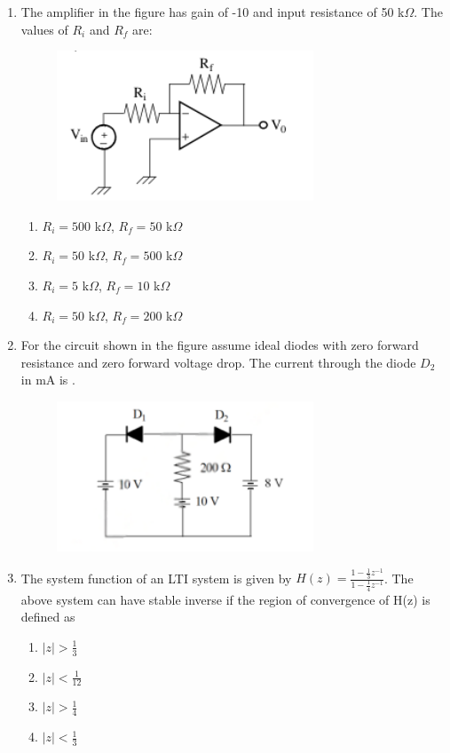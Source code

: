\documentclass[journal,12pt,onecolumn]{IEEEtran}
\theoremstyle{remark}
\begin{document}
\begin{enumerate}
    \item The amplifier in the figure has gain of -10 and input resistance of 50 k$\Omega$. The values of $R_i$ and $R_f$ are:
    \begin{figure}[H]
        \centering
        \includegraphics[width=0.4\columnwidth]{q14}
        \caption*{}
        \label{fig:placeholder}
    \end{figure}
    \begin{multicols}{2}
        \begin{enumerate}
            \item $R_i = 500$ k$\Omega$, $R_f = 50$ k$\Omega$
            \item $R_i = 50$ k$\Omega$, $R_f = 500$ k$\Omega$
            \item $R_i = 5$ k$\Omega$, $R_f = 10$ k$\Omega$
            \item $R_i = 50$ k$\Omega$, $R_f = 200$ k$\Omega$
        \end{enumerate}
    \end{multicols}
    
    \item For the circuit shown in the figure assume ideal diodes with zero forward resistance and zero forward voltage drop. The current through the diode $D_2$ in mA is \underline{\hspace{2cm}}.
    \begin{figure}[H]
        \centering
        \includegraphics[width=0.4\columnwidth]{q15}
        \caption*{}
        \label{fig:placeholder}
    \end{figure}
    
    \item The system function of an LTI system is given by $H(z) = \frac{1 - \frac{1}{3}z^{-1}}{1 - \frac{1}{4}z^{-1}}$. The above system can have stable inverse if the region of convergence of H(z) is defined as
    \begin{multicols}{4}
        \begin{enumerate}
            \item $|z| > \frac{1}{3}$
            \item $|z| < \frac{1}{12}$
            \item $|z| > \frac{1}{4}$
            \item $|z| < \frac{1}{3}$
        \end{enumerate}
    \end{multicols}
    

\end{enumerate}
\end{document}
